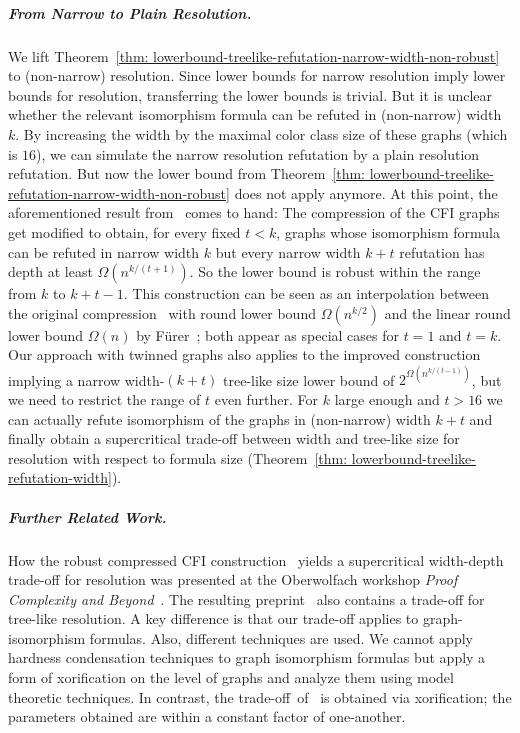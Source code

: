 \documentclass[10pt,a4paper]{article}
\begin{document}
\subparagraph{From Narrow to Plain Resolution.}
We lift Theorem~\ref{thm: lowerbound-treelike-refutation-narrow-width-non-robust} to (non-narrow) resolution.
Since lower bounds for narrow resolution imply lower bounds for resolution,
transferring the lower bounds is trivial.
But it is unclear whether the relevant isomorphism formula can be refuted in (non-narrow) width $k$.
By increasing the width by the maximal color class size of these graphs (which is $16$),
we can simulate the narrow resolution refutation by a plain resolution refutation.
But now the lower bound from Theorem~\ref{thm: lowerbound-treelike-refutation-narrow-width-non-robust} does not apply anymore.
At this point, the aforementioned result from~\cite{RFJN024} comes to hand:
The compression of the CFI graphs get modified to obtain,
for every fixed $t < k$, graphs whose isomorphism formula can be refuted in narrow width $k$ but
every narrow width $k+t$ refutation has depth at least
$\Omega(n^{k/(t+1)})$.
So the lower bound is robust within the range
from $k$ to $k+t-1$.
This construction can be seen as an interpolation between the 
original compression~\cite{DBLP:conf/focs/GroheLNS23} with round lower bound $\Omega(n^{k/2})$
and the linear round lower bound $\Omega(n)$ by Fürer~\cite{Furer2001};
both appear as special cases for $t=1$ and $t=k$.
Our approach with twinned graphs also applies
%
%
to the improved construction implying a narrow width-$(k+t)$ tree-like size lower bound of $2^{\Omega(n^{k/(t-1)})}$, but we need to restrict the range of $t$ even further.
%
%
For $k$ large enough and $t>16$
we can actually refute isomorphism of the graphs in (non-narrow) width $k+t$
and finally obtain a supercritical trade-off between width and
tree-like size for resolution with respect to formula size (Theorem~\ref{thm: lowerbound-treelike-refutation-width}).

\subparagraph{Further Related Work.}

How the robust compressed CFI construction~\cite{RFJN024} yields  a supercritical width-depth trade-off for resolution was presented at the Oberwolfach workshop \emph{Proof Complexity and Beyond}~\cite{oberwolfach2024}.
The resulting preprint~\cite{RFJN024} also contains a trade-off for
tree-like resolution.
A key difference is that our trade-off applies to graph-isomorphism formulas. Also, different techniques are used.
We cannot apply hardness condensation techniques to graph isomorphism formulas but apply a form of xorification on the level of graphs and analyze them using model theoretic techniques. In contrast, the trade-off~of~\cite{RFJN024} is obtained via xorification; the parameters obtained are within a constant factor of one-another. 
\end{document}

